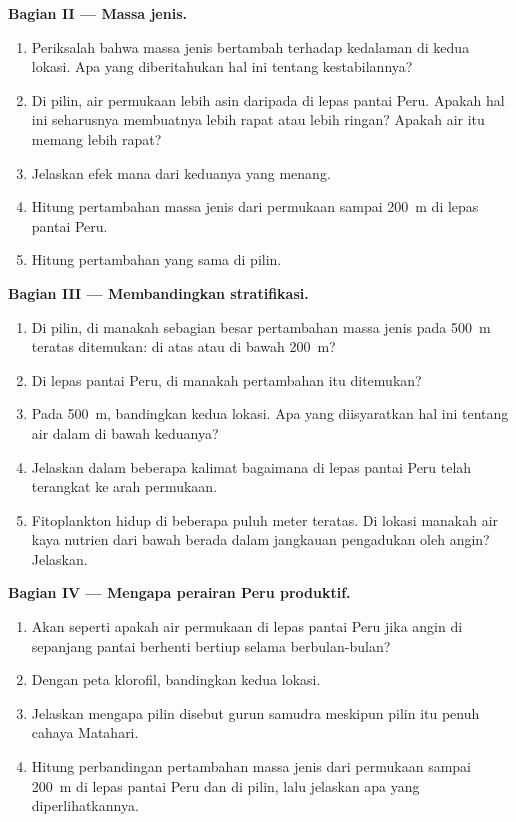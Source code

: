 \begin{problem}
\medskip
\noindent\textbf{Bagian II --- Massa jenis.}
\begin{enumerate}[resume]
  \item Periksalah bahwa massa jenis bertambah terhadap kedalaman di kedua
        lokasi. Apa yang diberitahukan hal ini tentang kestabilannya?
  \item Di pilin, air permukaan lebih asin daripada di lepas pantai Peru.
        Apakah hal ini seharusnya membuatnya lebih rapat atau lebih ringan?
        Apakah air itu memang lebih rapat?
  \item Jelaskan efek mana dari keduanya yang menang.
  \item Hitung pertambahan massa jenis dari permukaan sampai \qty{200}{m}
        di lepas pantai Peru.
  \item Hitung pertambahan yang sama di pilin.
\end{enumerate}

\medskip
\noindent\textbf{Bagian III --- Membandingkan stratifikasi.}
\begin{enumerate}[resume]
  \item Di pilin, di manakah sebagian besar pertambahan massa jenis pada
        \qty{500}{m} teratas ditemukan: di atas atau di bawah \qty{200}{m}?
  \item Di lepas pantai Peru, di manakah pertambahan itu ditemukan?
  \item Pada \qty{500}{m}, bandingkan kedua lokasi. Apa yang diisyaratkan hal
        ini tentang air dalam di bawah keduanya?
  \item Jelaskan dalam beberapa kalimat bagaimana  di lepas pantai
        Peru telah terangkat ke arah permukaan.
  \item Fitoplankton hidup di beberapa puluh meter teratas. Di lokasi manakah
        air kaya nutrien dari bawah  berada dalam jangkauan
        pengadukan oleh angin? Jelaskan.
\end{enumerate}

\medskip
\noindent\textbf{Bagian IV --- Mengapa perairan Peru produktif.}
\begin{enumerate}[resume]
  \item Akan seperti apakah air permukaan di lepas pantai Peru jika angin di
        sepanjang pantai berhenti bertiup selama berbulan-bulan?
  \item Dengan peta klorofil, bandingkan kedua lokasi.
  \item Jelaskan mengapa pilin disebut gurun samudra meskipun pilin itu penuh
        cahaya Matahari.
  \item Hitung perbandingan pertambahan massa jenis dari permukaan sampai
        \qty{200}{m} di lepas pantai Peru dan di pilin, lalu jelaskan apa yang
        diperlihatkannya.
\end{enumerate}
\end{problem}
